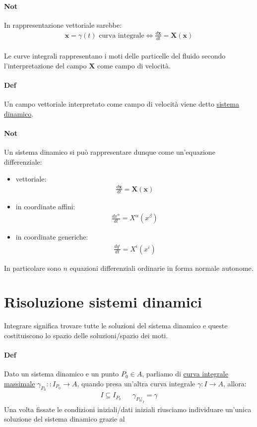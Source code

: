 \documentclass[10pt,a4paper]{book}
\begin{document}
\paragraph*{Not}In rappresentazione vettoriale sarebbe:
\begin{align*}
    \mathbf{x}=\gamma(t) \text{ curva integrale} \iff \frac{d\mathbf{x}}{dt}=\mathbf{X}(\mathbf{x})
\end{align*}\\
Le curve integrali rappresentano i moti delle particelle del fluido secondo l'interpretazione del campo $\mathbf{X}$ come campo di velocità.\\
\paragraph{Def} Un campo vettoriale interpretato come campo di velocità viene detto \underline{sistema dinamico}.
\paragraph{Not} Un sistema dinamico si può rappresentare dunque come un'equazione differenziale:
\begin{itemize}
        \item vettoriale:
        \begin{align*}
            \frac{d\mathbf{x}}{dt}=\mathbf{X}(\mathbf{x})
        \end{align*}
        \item in coordinate affini:
        \begin{align*}
            \frac{dx^\alpha}{dt}=X^\alpha (x^\beta)
        \end{align*}
        \item in coordinate generiche:
        \begin{align*}
            \frac{dq^i}{dt}=X^i (x^i)
        \end{align*}
\end{itemize}
In particolare sono $n$ equazioni differenziali ordinarie in forma normale autonome.
\section{Risoluzione sistemi dinamici} Integrare significa trovare tutte le soluzioni del sistema dinamico e queste costituiscono lo spazio delle soluzioni/spazio dei moti.
\paragraph*{Def}Dato un sistema dinamico e un punto $P_0\in A$, parliamo di \underline{curva integrale massimale} $\gamma_{P_0}\colon: I_{P_0}\to A$, quando presa un'altra curva integrale $\gamma\colon I\to A$, allora:
\begin{align*}
    I \subseteq I_{P_0}&& \gamma_{P_0|_I}=\gamma
\end{align*}
Una volta fissate le condizioni iniziali/dati iniziali riusciamo individuare un'unica soluzione del sistema dinamico grazie al
\end{document}
